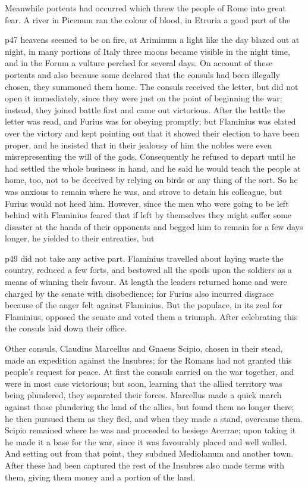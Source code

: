Meanwhile portents had occurred which threw the people of Rome into great fear. A river in Picenum ran the colour of blood, in Etruria a good part of the

p47 heavens seemed to be on fire, at Ariminum a light like the day blazed out at night, in many portions of Italy three moons became visible in the night time, and in the Forum a vulture perched for several days. On account of these portents and also because some declared that the consuls had been illegally chosen, they summoned them home. The consuls received the letter, but did not open it immediately, since they were just on the point of beginning the war; instead, they joined battle first and came out victorious. After the battle the letter was read, and Furius was for obeying promptly; but Flaminius was elated over the victory and kept pointing out that it showed their election to have been proper, and he insisted that in their jealousy of him the nobles were even misrepresenting the will of the gods. Consequently he refused to depart until he had settled the whole business in hand, and he said he would teach the people at home, too, not to be deceived by relying on birds or any thing of the sort. So he was anxious to remain where he was, and strove to detain his colleague, but Furius would not heed him. However, since the men who were going to be left behind with Flaminius feared that if left by themselves they might suffer some disaster at the hands of their opponents and begged him to remain for a few days longer, he yielded to their entreaties, but

p49 did not take any active part. Flaminius travelled about laying waste the country, reduced a few forts, and bestowed all the spoils upon the soldiers as a means of winning their favour. At length the leaders returned home and were charged by the senate with disobedience; for Furius also incurred disgrace because of the anger felt against Flaminius. But the populace, in its zeal for Flaminius, opposed the senate and voted them a triumph. After celebrating this the consuls laid down their office.

Other consuls, Claudius Marcellus and Gnaeus Scipio, chosen in their stead, made an expedition against the Insubres; for the Romans had not granted this people's request for peace. At first the consuls carried on the war together, and were in most case victorious; but soon, learning that the allied territory was being plundered, they separated their forces. Marcellus made a quick march against those plundering the land of the allies, but found them no longer there; he then pursued them as they fled, and when they made a stand, overcame them. Scipio remained where he was and proceeded to besiege Acerrae; upon taking it he made it a base for the war, since it was favourably placed and well walled. And setting out from that point, they subdued Mediolanum and another town. After these had been captured the rest of the Insubres also made terms with them, giving them money and a portion of the land.

